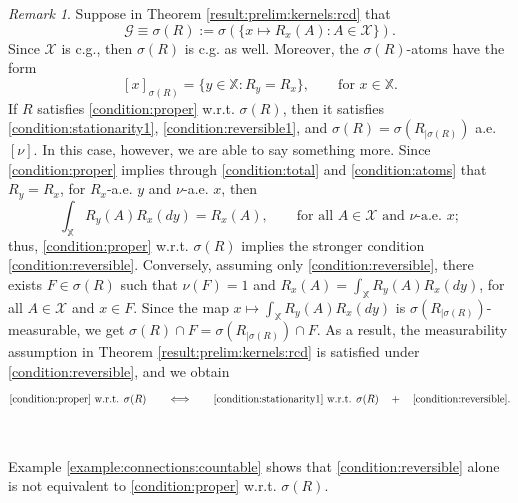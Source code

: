 \documentclass[a4paper]{article}
\theoremstyle{plain}
\theoremstyle{remark}
\newtheorem{remark}[theorem]{Remark}
\theoremstyle{definition}
\begin{document}
\begin{remark}\label{result:prelim:kernels:rcd:remark}
Suppose in Theorem \ref{result:prelim:kernels:rcd} that
\[\mathcal{G}\equiv\sigma(R):=\sigma(\{x\mapsto R_x(A):A\in\mathcal{X}\}).\]
Since $\mathcal{X}$ is c.g., then $\sigma(R)$ is c.g. as well. Moreover, the $\sigma(R)$-atoms have the form
\begin{equation}\label{condition:atoms}
[x]_{\sigma(R)}=\{y\in\mathbb{X}:R_y=R_x\},\qquad\mbox{for }x\in\mathbb{X}.
\end{equation}
If $R$ satisfies \eqref{condition:proper} w.r.t. $\sigma(R)$, then it satisfies \eqref{condition:stationarity1}, \eqref{condition:reversible1}, and $\sigma(R)=\sigma(R_{|\sigma(R)})$ a.e.$[\nu]$. In this case, however, we are able to say something more. Since \eqref{condition:proper} implies through \eqref{condition:total} and \eqref{condition:atoms} that $R_y=R_x$, for $R_x$-a.e. $y$ and $\nu$-a.e. $x$, then
\[\int_\mathbb{X}R_y(A)R_x(dy)=R_x(A),\qquad\mbox{for all }A\in\mathcal{X}\mbox{ and }\nu\mbox{-a.e. }x;\]
thus, \eqref{condition:proper} w.r.t. $\sigma(R)$ implies the stronger condition \eqref{condition:reversible}. Conversely, assuming only \eqref{condition:reversible}, there exists $F\in\sigma(R)$ such that $\nu(F)=1$ and $R_x(A)=\int_\mathbb{X}R_y(A)R_x(dy)$, for all $A\in\mathcal{X}$ and $x\in F$. Since the map $x\mapsto\int_\mathbb{X}R_y(A)R_x(dy)$ is $\sigma(R_{|\sigma(R)})$-measurable, we get $\sigma(R)\cap F=\sigma(R_{|\sigma(R)})\cap F$. As a result, the measurability assumption in Theorem \ref{result:prelim:kernels:rcd} is satisfied under \eqref{condition:reversible}, and we obtain
\[\eqref{condition:proper}\mbox{ w.r.t. }\sigma(R)\qquad\Longleftrightarrow\qquad\eqref{condition:stationarity1}\mbox{ w.r.t. }\sigma(R)\quad+\quad\eqref{condition:reversible}.\]
\end{remark}~ 

Example \ref{example:connections:countable} shows that \eqref{condition:reversible} alone is not equivalent to \eqref{condition:proper} w.r.t. $\sigma(R)$.
\end{document}
